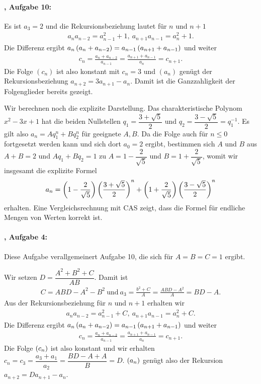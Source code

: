 \documentclass[11pt,a4paper]{article}
\begin{document}
\paragraph{\cite{S}, Aufgabe 10:}
Es ist $a_3=2$ und die Rekursionsbeziehung lautet für $n$ und $n+1$ 
\begin{gather*}
  a_na_{n-2}=a_{n-1}^2+1,\ a_{n+1}a_{n-1}=a_n^2+1.
\end{gather*}
Die Differenz ergibt $a_n\left(a_n+a_{n-2}\right)=a_{n-1}\left(a_{n+1}+a_{n-1}\right)$ und
weiter 
\begin{gather*}
  c_n=\frac{a_n+a_{n-2}}{a_{n-1}}=\frac{a_{n+1}+a_{n-1}}{a_n}=c_{n+1}.
\end{gather*}
Die Folge $(c_n)$ ist also konstant mit $c_n=3$ und $(a_n)$ genügt der
Rekursionsbeziehung $a_{n+2}=3a_{n+1}-a_n$.  Damit ist die Ganzzahligkeit der
Folgenglieder bereits gezeigt. 

Wir berechnen noch die explizite Darstellung.  Das charakteristische Polynom
$x^2-3x+1$ hat die beiden Nullstellen $q_1=\dfrac{3+\sqrt{5}}{2}$ und
$q_2=\dfrac{3-\sqrt{5}}{2}=q_1^{-1}$.  Es gilt also $a_n=Aq_1^n+Bq_2^n$ für
geeignete $A,B$.  Da die Folge auch für $n\le 0$ fortgesetzt werden kann und
sich dort $a_0=2$ ergibt, bestimmen sich $A$ und $B$ aus $A+B=2$ und
$Aq_1+Bq_2=1$ zu $A=1-\dfrac{2}{\sqrt{5}}$ und $B=1+\dfrac{2}{\sqrt{5}}$,
womit wir insgesamt die explizite Formel
\begin{gather*}
  a_n=\left(1-\frac{2}{\sqrt{5}}\right)\left(\frac{3+\sqrt{5}}{2}\right)^n
  +\left(1+\frac{2}{\sqrt{5}}\right)\left(\frac{3-\sqrt{5}}{2}\right)^n 
\end{gather*}
erhalten.  Eine Vergleichsrechnung mit CAS zeigt, dass die Formel für endliche
Mengen von Werten korrekt ist.

\paragraph{\cite{S}, Aufgabe 4:}
Diese Aufgabe verallgemeinert Aufgabe 10, die sich für $A=B=C=1$ ergibt. 

Wir setzen $D=\dfrac{A^2+B^2+C}{AB}$. Damit ist 
\begin{gather*}
  C=ABD-A^2-B^2\ \text{und}\ a_3=\frac{b^2+C}{A}=\frac{ABD-A^2}{A}=BD-A.
\end{gather*}
Aus der Rekursionsbeziehung für $n$ und $n+1$ erhalten wir
\begin{gather*}
  a_na_{n-2}=a_{n-1}^2+C,\ a_{n+1}a_{n-1}=a_n^2+C.
\end{gather*}
Die Differenz ergibt $a_n\left(a_n+a_{n-2}\right)=a_{n-1}\left(a_{n+1}+a_{n-1}\right)$ und
weiter 
\begin{gather*}
  c_n=\frac{a_n+a_{n-2}}{a_{n-1}}=\frac{a_{n+1}+a_{n-1}}{a_n}=c_{n+1}.
\end{gather*}
Die Folge $\left(c_n\right)$ ist also konstant und wir erhalten
$c_n=c_3=\dfrac{a_3+a_1}{a_2}=\dfrac{BD-A+A}{B}=D$.  $\left(a_n\right)$ genügt also
der Rekursion $a_{n+2}=Da_{n+1}-a_n$.
\end{document}
